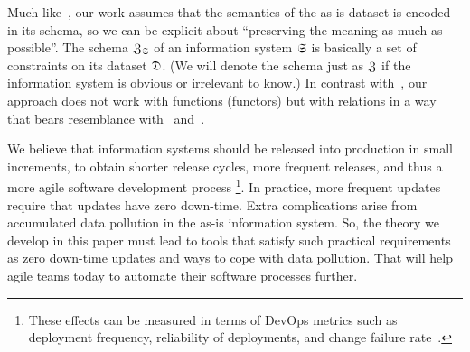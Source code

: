 \documentclass{elsarticle}
\begin{document}
   Much like~\cite{Spivak2012}, our work assumes that the semantics of the as-is dataset is encoded in its schema,
   so we can be explicit about ``preserving the meaning as much as possible''.
   The schema $\mathfrak{Z}_{\mathfrak{S}}$ of an information system $\mathfrak{S}$ is basically a set of constraints on its dataset $\mathfrak{D}$.
   (We will denote the schema just as $\mathfrak{Z}$ if the information system is obvious or irrelevant to know.)
   In contrast with~\cite{Spivak2012}, our approach does not work with functions (functors)
   but with relations in a way that bears resemblance with~\cite{Alloy2006} and~\cite{Zielinski2013}.

   We believe that information systems should be released into production in small increments,
   to obtain shorter release cycles, more frequent releases, and thus a more agile software development process%
   \footnote{These effects can be measured in terms of DevOps metrics such as
   deployment frequency,
   reliability of deployments, and
   change failure rate~\cite{DevOps2021}.}.
   In practice, more frequent updates require that updates have zero down-time.
   Extra complications arise from accumulated data pollution in the as-is information system.
   So, the theory we develop in this paper must lead to tools that satisfy such practical requirements as
   zero down-time updates and ways to cope with data pollution.
   That will help agile teams today to automate their software processes further.
\end{document}
